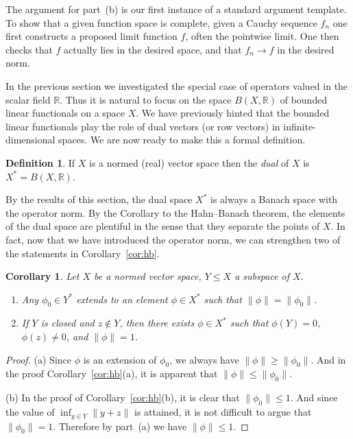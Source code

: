 \documentclass[11pt,oneside]{amsbook}
\newcommand{\RR}{{\mathbb R}}
\theoremstyle{definition}
\theoremstyle{plain}
\newtheorem{cor}[thm]{Corollary}
\theoremstyle{definition}
\newtheorem{defn}[thm]{Definition}
\theoremstyle{remark}
\numberwithin{equation}{section}
\numberwithin{figure}{section}
\begin{document}
The argument for part~(b) is our first instance of a standard argument template. To show that a given function space is complete, given a Cauchy sequence $f_n$ one first constructs a proposed limit function $f$, often the pointwise limit. One then checks that $f$ actually lies in the desired space, and that $f_n\to f$ in the desired norm.

In the previous section we investigated the special case of operators valued in the scalar field $\RR$. Thus it is natural to focus on the space $B(X,\RR)$ of bounded linear functionals on a space $X$. We have previously hinted that the bounded linear functionals play the role of dual vectors (or row vectors) in infinite-dimensional spaces. We are now ready to make this a formal definition.

\begin{defn}
  If $X$ is a normed (real) vector space then the \emph{dual} of $X$ is $X^*=B(X,\RR)$.
\end{defn}

By the results of this section, the dual space $X^*$ is always a Banach space with the operator norm. By the Corollary to the Hahn--Banach theorem, the elements of the dual space are plentiful in the sense that they separate the points of $X$. In fact, now that we have introduced the operator norm, we can strengthen two of the statements in Corollary~\ref{cor:hb}.

\begin{cor}
  \label{cor:hb2}
    Let $X$ be a normed vector space, $Y\leq X$ a subspace of $X$.
  \begin{enumerate}
  \item Any $\phi_0\in Y^*$ extends to an element $\phi\in X^*$ such that $\|\phi\|=\|\phi_0\|$.
  \item If $Y$ is closed and $z\notin Y$, then there exists $\phi\in X^*$ such that $\phi(Y)=0$, $\phi(z)\neq0$, and $\|\phi\|=1$.
  \end{enumerate}
\end{cor}

\begin{proof}
  (a) Since $\phi$ is an extension of $\phi_0$, we always have $\|\phi\|\geq\|\phi_0\|$. And in the proof Corollary~\ref{cor:hb}(a), it is apparent that $\|\phi\|\leq\|\phi_0\|$.

  (b) In the proof of Corollary~\ref{cor:hb}(b), it is clear that $\|\phi_0\|\leq 1$. And since the value of $\inf_{y\in Y}\|y+z\|$ is attained, it is not difficult to argue that $\|\phi_0\|=1$. Therefore by part~(a) we have $\|\phi\|\leq1$.
\end{proof}
\end{document}
